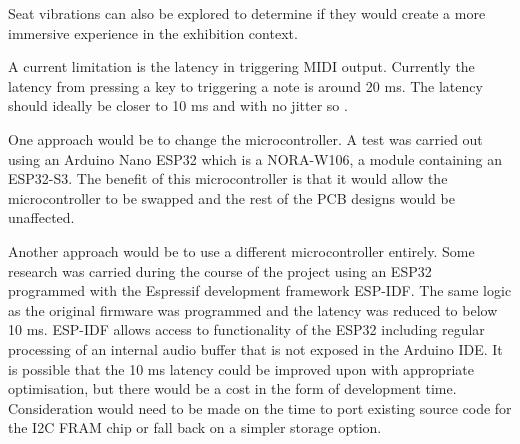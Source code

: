 Seat vibrations \cite{MusicalHaptics2018_07} can also be explored to determine if they would create a more immersive experience in the exhibition context.





A current limitation is the latency in triggering MIDI output. Currently the latency from pressing a key to triggering a note is around 20 ms. 
The latency should ideally be closer to 10 ms and with no jitter so \cite{Jack2016}.

One approach would be to change the microcontroller. A test
was carried out using an Arduino Nano ESP32 which is a NORA-W106, a module containing an ESP32-S3. 
The benefit of this microcontroller is that it would allow the microcontroller to be swapped and the rest of the PCB
designs would be unaffected.

Another approach would be to use a different microcontroller entirely. 
Some research was carried during the course of the project using an ESP32 programmed with the Espressif development framework ESP-IDF. 
The same logic as the original firmware was programmed and the latency was reduced to below 10 ms. ESP-IDF allows access to functionality of the ESP32 including regular processing of an internal audio buffer that is not exposed in the Arduino IDE. 
It is possible that the 10 ms latency could be improved upon with appropriate optimisation, but there would be a cost in the form of development time. 
Consideration would need to be made on the time to port existing source code for the I2C FRAM chip or fall back on a simpler storage option.

